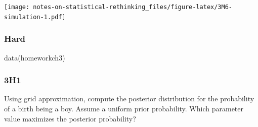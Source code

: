 \documentclass[
]{book}
\newenvironment{Shaded}{\begin{snugshade}}{\end{snugshade}}
\newcommand{\FunctionTok}[1]{\textcolor[rgb]{0.00,0.00,0.00}{#1}}
\newcommand{\NormalTok}[1]{#1}
\begin{document}
\texttt{[image: notes-on-statistical-rethinking\_files/figure-latex/3M6-simulation-1.pdf]}

\hypertarget{hard}{%
\subsubsection*{Hard}\label{hard}}

\begin{Shaded}
\begin{Highlighting}[]
\FunctionTok{data}\NormalTok{(homeworkch3)}
\end{Highlighting}
\end{Shaded}

\hypertarget{h1-1}{%
\subsubsection*{3H1}\label{h1-1}}

Using grid approximation, compute the posterior distribution for the probability of a birth being a boy. Assume a uniform prior probability. Which parameter value maximizes the posterior probability?
\end{document}

